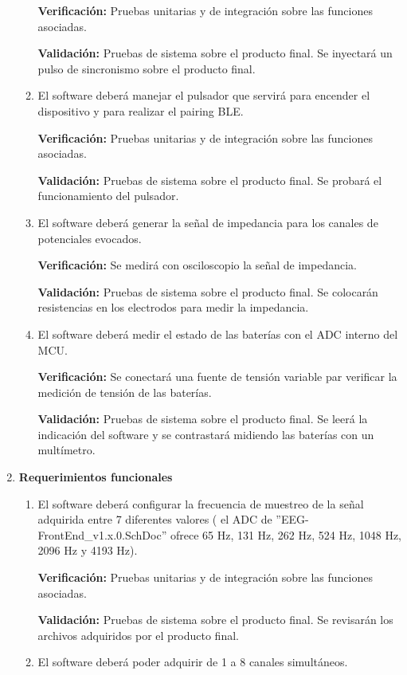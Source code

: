 \documentclass[
11pt, %
codirector, %
]{charter}
\begin{document}
\begin{enumerate}
\begin{enumerate}
			\textbf{Verificación:} Pruebas unitarias y de integración sobre las funciones asociadas. 			
			
			\textbf{Validación:}  Pruebas de sistema sobre el producto final. Se inyectará un pulso de sincronismo sobre el producto final.
			\item El software deberá manejar el pulsador que servirá para encender el dispositivo y para realizar el pairing BLE.
			
			\textbf{Verificación:} Pruebas unitarias y de integración sobre las funciones asociadas. 
			
			\textbf{Validación:} Pruebas de sistema sobre el producto final. Se probará el funcionamiento del pulsador.
			\item El software deberá generar la señal de impedancia para los canales de potenciales evocados.
			
			\textbf{Verificación:} Se medirá con osciloscopio la señal de impedancia.
			
			\textbf{Validación:} Pruebas de sistema sobre el producto final. Se colocarán resistencias en los electrodos para medir la impedancia.
			\item El software deberá medir el estado de las baterías con el ADC interno del MCU.
			
			\textbf{Verificación:} Se conectará una fuente de tensión variable par verificar la medición de tensión de las baterías.
			
			\textbf{Validación:} Pruebas de sistema sobre el producto final. Se leerá la indicación del software y se contrastará midiendo las baterías con un multímetro.
		\end{enumerate}
	\item \textbf{Requerimientos funcionales}
		\begin{enumerate}
			\item El software deberá configurar la frecuencia de muestreo de la señal adquirida entre 7 diferentes valores ( el ADC de ''EEG-FrontEnd\_v1.x.0.SchDoc” ofrece 65 Hz, 131 Hz, 262 Hz, 524 Hz, 1048 Hz, 2096 Hz y 4193 Hz).
			
			\textbf{Verificación:} Pruebas unitarias y de integración sobre las funciones asociadas.
			
			\textbf{Validación:} Pruebas de sistema sobre el producto final. Se revisarán los archivos adquiridos por el producto final.
			\item El software deberá poder adquirir de 1 a 8 canales simultáneos.
			

\end{enumerate}
\end{enumerate}
\end{document}
